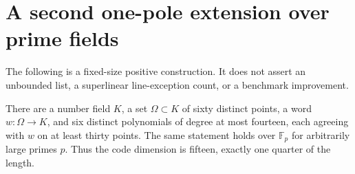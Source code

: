 \section{A second one-pole extension over prime fields}
\label{app:six-word-one-pole}

The following is a fixed-size positive construction.  It does not assert an
unbounded list, a superlinear line-exception count, or a benchmark improvement.

\begin{theorem}\label{thm:six-word-one-pole}
There are a number field $K$, a set $\Omega\subset K$ of sixty distinct
points, a word $w\colon\Omega\to K$, and six distinct polynomials of degree
at most fourteen, each agreeing with $w$ on at least thirty points.
The same statement holds over $\mathbb F_p$ for arbitrarily large primes $p$.
Thus the code dimension is fifteen, exactly one quarter of the length.
\end{theorem}

